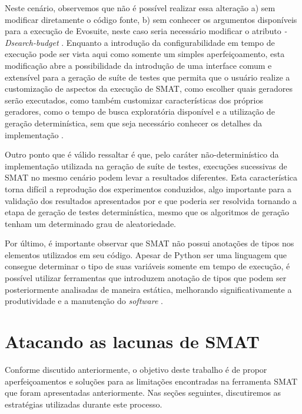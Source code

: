 \documentclass[12pt]{article}
\begin{document}
Neste cenário, observemos que não é possível realizar essa alteração a) sem modificar diretamente o código fonte, b) sem conhecer os argumentos disponíveis para a execução de Evosuite, neste caso seria necessário modificar o atributo \textit{-Dsearch-budget} \cite{evosuite:manual}. Enquanto a introdução da configurabilidade em tempo de execução pode ser vista aqui como somente um simples aperfeiçoamento, esta modificação abre a possibilidade da introdução de uma interface comum e extensível para a geração de suíte de testes que permita que o usuário realize a customização de aspectos da execução de SMAT, como escolher quais geradores serão executados, como também customizar características dos próprios geradores, como o tempo de busca exploratória disponível e a utilização de geração determinística, sem que seja necessário conhecer os detalhes da implementação \cite{ousterhout2018philosophy}.

Outro ponto que é válido ressaltar é que, pelo caráter não-determinístico da implementação utilizada na geração de suíte de testes, execuções sucessivas de SMAT no mesmo cenário podem levar a resultados diferentes. Esta característica torna difícil a reprodução dos experimentos conduzidos, algo importante para a validação dos resultados apresentados por \cite{leuson:icsme} e que poderia ser resolvida tornando a etapa de geração de testes determinística, mesmo que os algoritmos de geração tenham um determinado grau de aleatoriedade.

Por último, é importante observar que SMAT não possui anotações de tipos nos elementos utilizados em seu código. Apesar de Python ser uma linguagem que consegue determinar o tipo de suas variáveis somente em tempo de execução, é possível utilizar ferramentas que introduzem anotação de tipos \cite{lehtosalo2021mypy} que podem ser posteriormente analisadas de maneira estática, melhorando significativamente a produtividade \cite{hanenberg2009impact} e a manutenção do \textit{software} \cite{kleinschmager2012static}.

\section{Atacando as lacunas de SMAT}
Conforme discutido anteriormente, o objetivo deste trabalho é de propor aperfeiçoamentos e soluções para as limitações encontradas na ferramenta SMAT que foram apresentadas anteriormente. Nas seções seguintes, discutiremos as estratégias utilizadas durante este processo.
\end{document}
